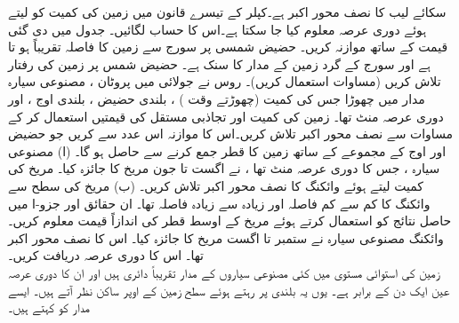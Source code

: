 سکائے  لیب   کا نصف محور اکبر  ہے۔کپلر کے تیسرے قانون  میں زمین کی کمیت کو  لیتے ہوئے دوری عرصہ  معلوم کیا جا سکتا ہے۔اس کا حساب لگائیں۔ جدول  میں دی گئی  قیمت کے ساتھ موازنہ کریں۔
حضیض شمسی پر سورج سے زمین کا فاصلہ تقریباً  ہو تا ہے اور  سورج کے گرد زمین کے مدار کا سنک  ہے۔ حضیض شمس پر زمین کی رفتار  تلاش کریں (مساوات  استعمال کریں)۔
روس نے جولائی  میں پروٹان  ، مصنوعی سیارہ مدار میں چھوڑا جس کی کمیت  (چھوڑتے وقت ) ،  بلندی حضیض ، بلندی اوج ،  اور دوری عرصہ  منٹ  تھا۔  زمین کی کمیت اور تجاذبی مستقل  کی قیمتیں استعمال کر کے مساوات  سے  نصف محور اکبر   تلاش کریں۔اس کا موازنہ اس عدد سے کریں جو حضیض اور اوج کے مجموعے  کے ساتھ  زمین کا قطر جمع  کرنے سے حاصل ہو گا۔
(ا)    مصنوعی سیارہ ، جس کا دوری عرصہ  منٹ تھا ، نے   اگست   تا جون   مریخ کا جائزہ  کیا۔  مریخ کی کمیت  لیتے ہوئے  وائکنگ   کا نصف محور اکبر تلاش کریں۔ (ب) مریخ کی سطح  سے وائکنگ   کا کم سے کم فاصلہ  اور زیادہ سے زیادہ فاصلہ   تھا۔ ان حقائق اور جزو-ا میں حاصل نتائج کو  استعمال کرتے ہوئے مریخ کے اوسط  قطر کی   اندازاً  قیمت معلوم کریں۔
وائکنگ  مصنوعی سیارہ نے ستمبر    تا اگست  مریخ کا جائزہ  کیا۔ اس کا  نصف محور اکبر  تھا۔ اس کا دوری عرصہ دریافت کریں۔
\\
زمین کی استوائی مستوی میں کئی مصنوعی سیاروں  کے مدار تقریباً دائری ہیں اور ان کا دوری عرصہ عین  ایک دن کے برابر ہے۔  یوں یہ بلندی پر رہتے ہوئے   سطح زمین کے اوپر ساکن نظر آتے ہیں۔ ایسے مدار کو  کہتے ہیں۔
